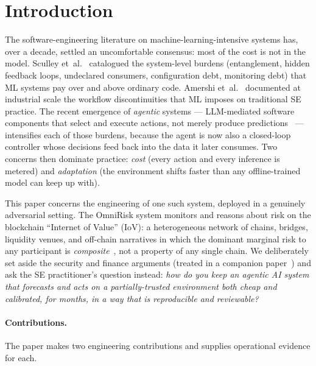 \documentclass[11pt,a4paper]{article}
\begin{document}
\section{Introduction}\label{sec:intro}

The software-engineering literature on machine-learning-intensive
systems has, over a decade, settled an uncomfortable consensus: most of
the cost is not in the model. Sculley
et~al.~\cite{sculley2015hidden} catalogued the system-level burdens
(entanglement, hidden feedback loops, undeclared consumers, configuration
debt, monitoring debt) that ML systems pay over and above ordinary code.
Amershi et~al.~\cite{amershi2019software} documented at industrial scale
the workflow discontinuities that ML imposes on traditional SE practice.
The recent emergence of \emph{agentic} systems --- LLM-mediated software
components that select and execute actions, not merely produce
predictions~\cite{wang2024survey,bai2022constitutional} --- intensifies
each of those burdens, because the agent is now also a closed-loop
controller whose decisions feed back into the data it later consumes.
Two concerns then dominate practice: \emph{cost} (every action and every
inference is metered) and \emph{adaptation} (the environment shifts
faster than any offline-trained model can keep up with).

This paper concerns the engineering of one such system, deployed in a
genuinely adversarial setting. The OmniRisk system monitors and reasons
about risk on the blockchain ``Internet of Value'' (IoV): a heterogeneous
network of chains, bridges, liquidity venues, and off-chain narratives in
which the dominant marginal risk to any participant is
\emph{composite}~\cite{augusto2024sok,zhang2023sok,belchior2021survey,wu2025safeguarding},
not a property of any single chain. We deliberately set aside the
security and finance arguments (treated in a companion
paper~\cite{omnirisk2026defending}) and ask the SE practitioner's
question instead: \emph{how do you keep an agentic AI system that
forecasts and acts on a partially-trusted environment both cheap and
calibrated, for months, in a way that is reproducible and reviewable?}

\paragraph{Contributions.}
The paper makes two engineering contributions and supplies operational
evidence for each.
\end{document}
